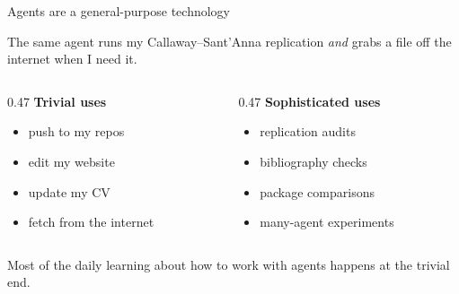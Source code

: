 \documentclass[aspectratio=169,11pt]{beamer}
\begin{document}
\begin{frame}{Agents are a general-purpose technology}

The same agent runs my Callaway--Sant'Anna replication \emph{and} grabs a file off the internet when I need it.

\vspace{0.25cm}

\begin{columns}[T]
\begin{column}{0.47\textwidth}
\textbf{Trivial uses}
\begin{itemize}\setlength\itemsep{0.1em}
    \item push to my repos
    \item edit my website
    \item update my CV
    \item fetch from the internet
\end{itemize}
\end{column}
\begin{column}{0.47\textwidth}
\textbf{Sophisticated uses}
\begin{itemize}\setlength\itemsep{0.1em}
    \item replication audits
    \item bibliography checks
    \item package comparisons
    \item many-agent experiments
\end{itemize}
\end{column}
\end{columns}

\vspace{0.3cm}

\alert{Most of the daily learning about how to work with agents happens at the trivial end.}

\end{frame}
\end{document}
